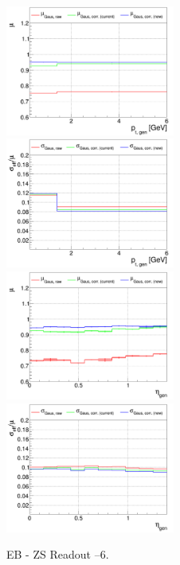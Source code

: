 \begin{figure}
\includegraphics[width=0.495\textwidth]{./plots_pdf/ECAL_plots/plotsPU/EB/ZS/pdf/GENPT/EBZS_GENPT_0000_0006_MuOverBins.pdf}
\includegraphics[width=0.495\textwidth]{./plots_pdf/ECAL_plots/plotsPU/EB/ZS/pdf/GENPT/EBZS_GENPT_0000_0006_EffSigmaOverBins.pdf}
\includegraphics[width=0.495\textwidth]{./plots_pdf/ECAL_plots/plotsPU/EB/ZS/pdf/GENETA/EBZS_GENETA_0000_0006_MuOverBins.pdf}
\includegraphics[width=0.495\textwidth]{./plots_pdf/ECAL_plots/plotsPU/EB/ZS/pdf/GENETA/EBZS_GENETA_0000_0006_EffSigmaOverBins.pdf}
\caption{EB - ZS Readout --6\GeV.}
\label{fig:PU_EBZS}
\end{figure}

